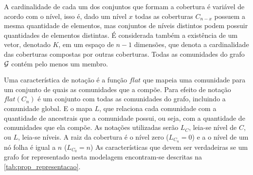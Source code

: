\documentclass[notes.tex]{subfiles}
\begin{document}
A cardinalidade de cada um dos conjuntos que formam a cobertura é variável de acordo com o nível, isso é, dado um nível $x$ todas as coberturas  $C_{n-x}$ possuem a mesma quantidade de elementos, mas conjuntos de níveis distintos podem possuir quantidades de elementos distintas.
É considerada também a existência de um vetor, denotado $K$, em um espaço de $n-1$ dimensões, que denota a cardinalidade das coberturas compostas por outras coberturas.
Todas as comunidades do grafo $\operatorname{\mathcal{G}}$ contém pelo menos um membro.

Uma característica de notação é a função $flat$ que mapeia uma comunidade para um conjunto de quais as comunidades que a compõe.
Para efeito de notação $flat(C_n)$ é um conjunto com todas as comunidades do grafo, incluindo a comunidade global.
E o mapa $L$, que relaciona cada comunidade com a quantidade de ancestrais que a comunidade possui, ou seja, com a quantidade de comunidades que ela compõe.
As notações utilizadas serão  $L_C$, leia-se nível de $C$, ou $L$, leia-se níveis.
A raiz da cobertura é o nível zero ($L_{C_n} = 0$) e a o nível de um nó folha é igual a $n$ ($L_{C_0}=n$)
As características que devem ser verdadeiras se um grafo for representado nesta modelagem encontram-se descritas na \autoref{tab:prop_representacao}.
\end{document}

